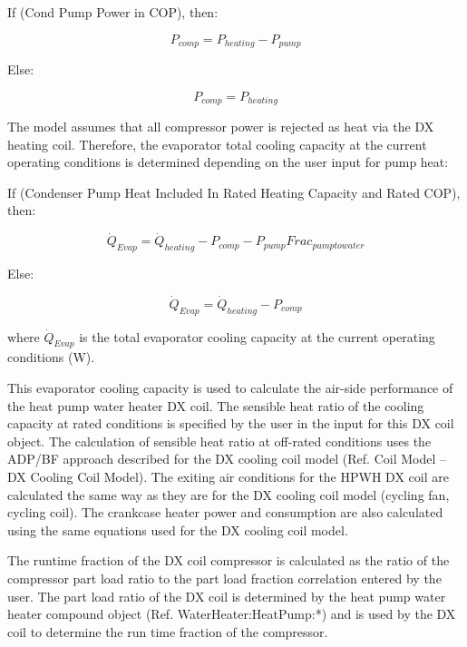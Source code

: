 If (Cond Pump Power in COP), then:

\begin{equation}
  P_{comp} = P_{heating}-P_{pump}
\end{equation}

Else:

\begin{equation}
  P_{comp} = P_{heating}
\end{equation}

The model assumes that all compressor power is rejected as heat via the DX heating coil. Therefore, the evaporator total cooling capacity at the current operating conditions is determined depending on the user input for pump heat:

If (Condenser Pump Heat Included In Rated Heating Capacity and Rated COP), then:

\begin{equation}
  \dot{Q}_{Evap} = \dot{Q}_{heating} - P_{comp} - P_{pump}Frac_{pumptowater}
\end{equation}

Else:

\begin{equation}
  \dot{Q}_{Evap} = \dot{Q}_{heating} - P_{comp}
\end{equation}

where \({\dot{Q}_{Evap}}\) is the total evaporator cooling capacity at the current operating conditions (W).

This evaporator cooling capacity is used to calculate the air-side performance of the heat pump water heater DX coil. The sensible heat ratio of the cooling capacity at rated conditions is specified by the user in the input for this DX coil object. The calculation of sensible heat ratio at off-rated conditions uses the ADP/BF approach described for the DX cooling coil model (Ref. Coil Model -- DX Cooling Coil Model). The exiting air conditions for the HPWH DX coil are calculated the same way as they are for the DX cooling coil model (cycling fan, cycling coil). The crankcase heater power and consumption are also calculated using the same equations used for the DX cooling coil model.

The runtime fraction of the DX coil compressor is calculated as the ratio of the compressor part load ratio to the part load fraction correlation entered by the user. The part load ratio of the DX coil is determined by the heat pump water heater compound object (Ref. WaterHeater:HeatPump:*) and is used by the DX coil to determine the run time fraction of the compressor.

